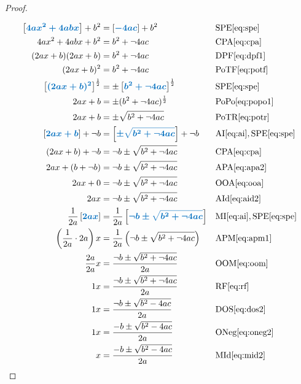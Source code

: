 \documentclass[20150903-160354-rs2.2-MarksMathNotebook.tex]{subfiles}
\begin{document}
\begin{proof}
\begin{center}
\end{center}

\begin{align*}
\farg{4ax^2+4abx}+b^2 & = \farg{-4ac}+b^2 && \text{SPE} \eqref{eq:spe} \\
4ax^2+4abx+b^2 &= b^2 + \neg 4ac && \text{CPA} \eqref{eq:cpa} \\
(2ax+b)(2ax+b) &= b^2 + \neg 4ac && \text{DPF} \eqref{eq:dpf1} \\
(2ax+b)^2 &= b^2 + \neg 4ac && \text{PoTF} \eqref{eq:potf} \\
\farg{(2ax+b)^2}^{\frac{1}{2}} &= \pm \farg{b^2 + \neg 4ac}^{\frac{1}{2}} && \text{SPE} \eqref{eq:spe} \\
2ax+b &=  \pm (b^2 + \neg 4ac)^{\frac{1}{2}} && \text{PoPo} \eqref{eq:popo1} \\
2ax+b &= \pm \sqrt{b^2+\neg 4ac} && \text{PoTR} \eqref{eq:potr} \\
\farg{2ax+b}+\neg b &= \farg{ \pm \sqrt{b^2+\neg 4ac}}+\neg b && \text{AI} \eqref{eq:ai},\text{SPE} \eqref{eq:spe}  \\
(2ax+b)+\neg b &= \neg b \pm \sqrt{b^2+\neg 4ac} && \text{CPA} \eqref{eq:cpa} \\
2ax+(b+\neg b) &= \neg b \pm \sqrt{b^2+\neg 4ac}  && \text{APA} \eqref{eq:apa2} \\
2ax+0 &= \neg b \pm \sqrt{b^2+\neg 4ac} && \text{OOA} \eqref{eq:ooa} \\
2ax &= \neg b \pm \sqrt{b^2+\neg 4ac} && \text{AId} \eqref{eq:aid2} \\
\dfrac{1}{2a} \farg{2ax} &= \dfrac{1}{2a} \farg{\neg b \pm \sqrt{b^2+\neg 4ac}}  && \text{MI} \eqref{eq:ai},\text{SPE} \eqref{eq:spe}  \\
\left(\dfrac{1}{2a}\cdot 2a\right)x &= \dfrac{1}{2a} \left( \neg b \pm \sqrt{b^2+\neg 4ac} \right) && \text{APM} \eqref{eq:apm1} \\
\dfrac{2a}{2a}x &= \dfrac{\neg b \pm \sqrt{b^2+\neg 4ac}}{2a} && \text{OOM} \eqref{eq:oom} \\
1x &=\dfrac{\neg b \pm \sqrt{b^2+\neg 4ac}}{2a} && \text{RF} \eqref{eq:rf}\\
1x &=\dfrac{\neg b \pm \sqrt{b^2-4ac}}{2a} && \text{DOS} \eqref{eq:dos2} \\
1x &=\dfrac{- b \pm \sqrt{b^2-4ac}}{2a} && \text{ONeg} \eqref{eq:oneg2} \\
x &=\dfrac{- b \pm \sqrt{b^2-4ac}}{2a} && \text{MId} \eqref{eq:mid2} \\
\end{align*}

\end{proof}   
\end{document}
